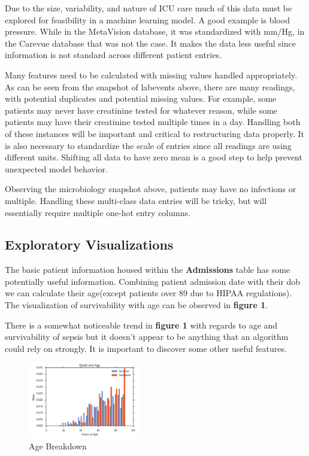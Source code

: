 \documentclass[11pt]{article}
\begin{document}
	Due to the size, variability, and nature of ICU care much of this data must be explored for feasibility in a machine learning model. A good example is blood pressure. While in the MetaVision database, it was standardized with mm/Hg, in the Carevue database that was not the case. It makes the data less useful since information is not standard across different patient entries.
	
	Many features need to be calculated with missing values handled appropriately. As can be seen from the snapshot of labevents above, there are many readings, with potential duplicates and potential missing values. For example, some patients may never have creatinine tested for whatever reason, while some patients may have their creatinine tested multiple times in a day. Handling both of these instances will be important and critical to restructuring data properly. It is also necessary to standardize the scale of entries since all readings are using different units. Shifting all data to have zero mean is a good step to help prevent unexpected model behavior.
	
	Observing the microbiology snapshot above, patients may have no infections or multiple. Handling these multi-class data entries will be tricky, but will essentially require multiple one-hot entry columns.
	
	\subsection{Exploratory Visualizations}
	
	The basic patient information housed within the \textbf{Admissions} table has some potentially useful information. Combining patient admission date with their dob we can calculate their age(except patients over 89 due to HIPAA regulations). The visualization of survivability with age can be observed in \textbf{figure 1}.
	
	There is a somewhat noticeable trend in \textbf{figure 1} with regards to age and survivability of sepsis but it doesn't appear to be anything that an algorithm could rely on strongly. It is important to discover some other useful features.
	
	\begin{figure}
		\begin{center}
			\includegraphics[width=0.44\textwidth]{age.png}
		\end{center}
		\caption{Age Breakdown}
	\end{figure}
	
\end{document}
